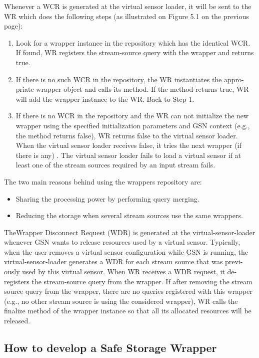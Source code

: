 Whenever a WCR is generated at the virtual sensor loader, it will be sent
to the WR which does the following steps (as illustrated on Figure 5.1 on the
previous page):
\begin{enumerate}
\item Look for a wrapper instance in the repository which has the identical
WCR. If found, WR registers the stream-source query with the wrapper
and returns true.
\item If there is no such WCR in the repository, the WR instantiates the appro-
priate wrapper object and calls its  method. If the 
method returns true, WR will add the wrapper instance to the WR. Back
to Step 1.
\item If there is no WCR in the repository and the WR can not initialize the
new wrapper using the specified initialization parameters and GSN context
(e.g., the  method returns false), WR returns false to the
virtual sensor loader. When the virtual sensor loader receives false, it
tries the next wrapper (if there is any) . The virtual sensor loader fails to
load a virtual sensor if at least one of the stream sources required by an
input stream fails.
\end{enumerate}

The two main reasons behind using the wrappers repository are:
\begin{itemize}
\item Sharing the processing power by performing query merging.
\item Reducing the storage when several stream sources use the same wrappers.
\end{itemize}TheWrapper Disconnect Request (WDR) is generated at the virtual-sensor-loader
whenever GSN wants to release resources used by a virtual sensor. Typically,
when the user removes a virtual sensor configuration while GSN is running, the
virtual-sensor-loader generates a WDR for each stream source that was previ-
ously used by this virtual sensor.
When WR receives a WDR request, it de-registers the stream-source query
from the wrapper. If after removing the stream source query from the wrapper,
there are no queries registered with this wrapper (e.g., no other stream source is
using the considered wrapper), WR calls the finalize method of the wrapper
instance so that all its allocated resources will be released.

\newpage
\subsection{How to develop a Safe Storage Wrapper}

